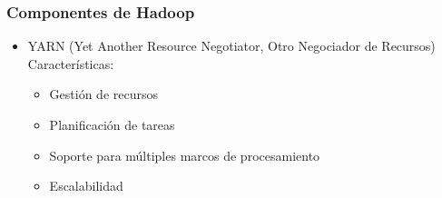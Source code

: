 \documentclass[
10pt, %
aspectratio=169, %
]{beamer}
\begin{document}
	\begin{frame}
		
		\frametitle{Componentes de Hadoop}
		
		\begin{itemize}
			\item YARN (Yet Another Resource Negotiator, Otro Negociador de Recursos) \\[3mm]
			
			Características:
			\begin{itemize}
				
				\item Gestión de recursos \\[1mm]
				
				\item Planificación de tareas \\[1mm]
				
				\item Soporte para múltiples marcos de procesamiento \\[1mm]
				
				\item Escalabilidad \\[1mm]
				
			\end{itemize}
			
		\end{itemize}
		
	\end{frame}
	
\end{document}
